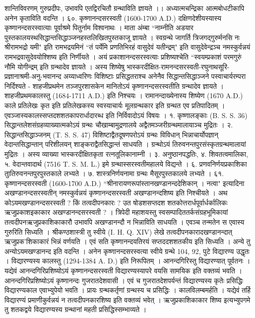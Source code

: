 शान्तिविवरणम् गुरुप्रदीपः, उभावपि एतद्विरचितौ ग्रन्थाविति ज्ञायते ।। अध्यात्मचन्द्रिका आत्मबोधटीकापि अनेन कृताविति वदन्ति ।
६०. कृष्णानन्दसरस्वती (1600-1700 A.D.)
दक्षिणदेशीयस्यास्य कृष्णानन्दसरस्वात्याः पूर्वाश्रमे पितुर्नाम विश्वनाथः । माता अंम्बा ``नाम्नीति अडयार पुस्तकालयस्थसिद्धान्तसिद्धाञ्जनहस्तलिखितपुस्तकाजू ज्ञायते । स्वग्रन्थे जागर्ति त्रिजगद्गुरुर्मनसि नः श्रीरामभद्रो यमी" इति रामभद्रयमिनं ``तं पर्येमि प्रणतिभिरहं वासुदेवं यतीन्द्रम्" इति वासुदेवेन्द्रञ्च नमस्कुर्वन्नयं रामभद्रवासुदेवयोश्शिष्य इति निर्णीयते । अयं प्रकाशानन्दसरस्वत्याः प्रशिष्यश्चेति ``स्वयम्प्रकाशं परमगुरुं नौमि योगीन्द्रम् इति ग्रन्थादेव ज्ञायते । अस्य शिष्येषु भास्करदीक्षित-रामनन्दसरस्वती-रघुनाथसूरि-प्रज्ञानाश्रमी-अनु-भवानन्द अय्याध्वरिणः विशिष्टाः प्रसिद्धतराश्च अनेनैव सिद्धान्तसिद्धाञ्जने पस्वाचार्यरम्परा निर्दिश्यते -
शाहजीप्रथमेन तञ्जपुरशासकेन मानितोऽयं कृष्णानन्दसरस्वतीति ग्रन्थादेव ज्ञायते । शाहजीप्रथमकालस्तु (1684-1711 A.D.) इति निश्चयः । रामानन्दाख्येनास्य शिष्येण (1670 A.D.) काले प्रतिलेखः कृत इति प्रतिलेखकस्य स्वस्याचार्यः मूलग्रन्थकार इति ग्रन्थत एव प्रतिपादितम् । एवञ्जास्यकालस्सप्तदशशतकापरार्धादारब्ध इति निर्विवादोऽयं विषयः ।
१. कृष्णालङ्काः (B. S. S. 36)
सिद्धान्तलेशसंग्रहव्याख्यात्मकोऽयं ग्रन्थः चौखाम्बामुद्रणालये अद्वैतमञ्जरीग्रन्थमालायाञ्च मुद्रितः ।
२. सिद्धान्तसिद्धाञ्जनम् (T. S. S. 47)
विशिष्टाद्वैतदूषणपरोऽयं ग्रन्थः विविधान् भिन्नाचार्योपज्ञान् वेदान्तसिद्धान्तान् परिशीलयन् शाङ्कराद्वैतसिद्धान्तं साधयति । ग्रन्थोऽयं तिरुवनन्तपुरसंस्कृतग्रन्थमालायां मुद्रितः । अस्य व्याख्या भास्करदीक्षितकृता रत्नतूलिकानाम्नी ।
३. अनुष्ठानपद्धतिः, ४. शिवतत्वमालिका, ५. वेदान्तवादार्थ (7516 T. S. M. L.) इमे ग्रन्थास्सरस्वतीमहालये विद्यन्ते । ६. प्रणवनिर्णयप्रकाशिका तुातिरुवनन्तपुरपुस्तकाले लभ्यते । ७. शास्त्रनिर्णयनामा ग्रन्थः मैसूरपुस्तकालये लभ्यते ।
६१. कृष्णानन्दसरस्वती (1600-1700 A.D.)
``श्रीनारायणरूपांस्तानखण्डानन्ददेशिकान् । नत्वा" इत्यादिना अखण्डानन्दसरस्वतीन् नमस्कुर्वन्नयं कृष्णानन्दसरस्वती अखण्डानन्दशिष्य इति निश्चीयते ।
अथ कोऽयमखण्डानन्दसरस्वती ? किं तत्वदीपनकारः ? उत षोडशसप्तदश शतकोत्तरार्धपूर्वार्धर्कालिकः ऋजुप्रकाशइकाकार अखण्डानन्दसरस्वती ? । त्रिपेदी महाशयस्तु स्वसम्पादिततर्कसंग्रहभूमिकायां तत्वदीपनऋजुप्रकाशिकाकारौ उभावपि अखण्डानन्दौ न भिन्नाविति साधयति । एवञ्च तन्मतेन स एवास्य गुरुरिति सिध्यति । श्रीकण्ठशास्त्री तु स्वीये (I. H. Q. XIV) लेखे तत्वदीपनकारादखण्डानन्दात् ऋजुप्रक'शिकाकारं भिन्नं वर्णयति । एवं सति कृष्णानन्दयतिरयं सप्तददशशतकीय इति सिध्यति । अन्ये तु अन्योऽयमखण्डानन्द इति वदन्ति ।
अनेन कृष्णानन्दसरस्वत्या स्वीये ग्रन्थे 104, 92, पुटे विद्यारण्य उद्धृतः । विद्यारण्यस्य कालस्तु (1294-1384 A. D.) इति निरूपितम् । आनन्दगिरिस्तु विद्यारण्यात् पूर्वतनः । यद्येवं आनन्दगिरिप्रशिष्योऽयं कृष्णानन्दसरस्वती विद्यारण्यस्यापरे वयसि सामयिक इति वक्तव्यं भवति । आनन्दगिरिप्रशिष्योऽयं कृष्णानन्दः गुजरातदेशवासी । एवं च गुजरातदेशपर्यन्तं विद्यारण्यस्य कृतेः प्रसिद्धिः विद्यारण्यकाल एवाभ्युपेयो भवति । प्रायः ग्रन्थकर्तृणां ग्रन्थस्य च प्रसिद्धिः । कालविलम्बमर्हति । यद्येवं तर्हि विद्यारण्यं प्रमाणीकुर्वन्नयं न तत्वदीपनकारशिष्य इति वक्तव्यं भवेत् । ऋजुप्रकाशिकाकार शिष्य इत्यभ्युपगमे तु शतकद्वये विद्यारण्यस्य ग्रन्थानां महती प्रसिद्धिस्सम्भाव्यते ।
